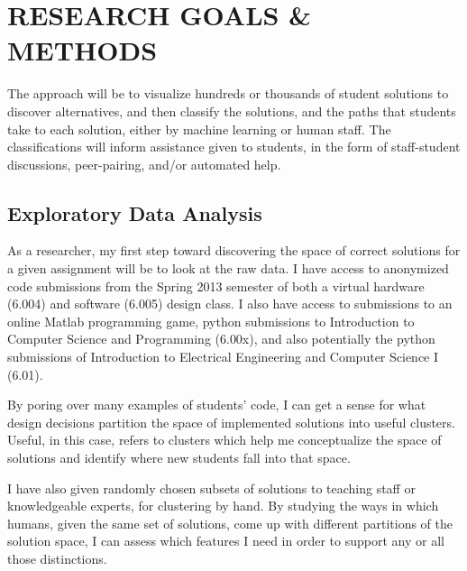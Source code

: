 \documentclass[12pt]{article}
\begin{document}
\section{RESEARCH GOALS \& METHODS}

The approach will be to visualize hundreds or thousands of student solutions to discover alternatives, and then classify the solutions, and the paths that students take to each solution, either by machine learning or human staff. The classifications will inform assistance given to students, in the form of staff-student discussions, peer-pairing, and/or automated help.


\subsection{Exploratory Data Analysis}

As a researcher, my first step toward discovering the space of correct solutions for a given assignment will be to look at the raw data. I have access to anonymized code submissions from the Spring 2013 semester of both a virtual hardware (6.004) and software (6.005) design class. I also have access to submissions to an online Matlab programming game, python submissions to Introduction to Computer Science and Programming (6.00x), and also potentially the python submissions of Introduction to Electrical Engineering and Computer Science I (6.01). 

By poring over many examples of students' code, I can get a sense for what design decisions partition the space of implemented solutions into useful clusters. Useful, in this case, refers to clusters which help me conceptualize the space of solutions and identify where new students fall into that space. 

I have also given randomly chosen subsets of solutions to teaching staff or knowledgeable experts, for clustering by hand. By studying the ways in which humans, given the same set of solutions, come up with different partitions of the solution space, I can assess which features I need in order to support any or all those distinctions. 
\end{document}
